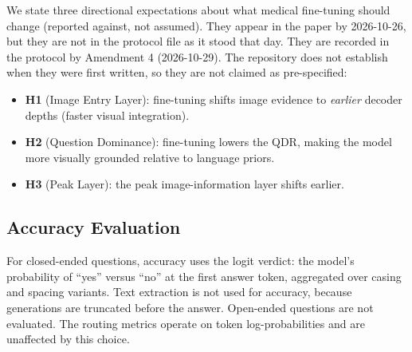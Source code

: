 We state three directional expectations about what medical fine-tuning should change
(reported against, not assumed). They appear in the paper by
2026-10-26, but they are not in the protocol file as it stood that day. They are recorded in
the protocol by Amendment 4 (2026-10-29). The repository does not establish when they were
first written, so they are not claimed as pre-specified:
\begin{itemize}
  \item \textbf{H1} (Image Entry Layer): fine-tuning shifts image evidence to
        \emph{earlier} decoder depths (faster visual integration).
  \item \textbf{H2} (Question Dominance): fine-tuning lowers the QDR, making the
        model more visually grounded relative to language priors.
  \item \textbf{H3} (Peak Layer): the peak image-information layer shifts earlier.
\end{itemize}

\subsection{Accuracy Evaluation}

For closed-ended questions, accuracy uses the logit verdict: the model's probability of
``yes'' versus ``no'' at the first answer token, aggregated over casing and spacing
variants. Text extraction is not used for accuracy, because generations are truncated
before the answer. Open-ended questions are not evaluated. The routing metrics operate on
token log-probabilities and are unaffected by this choice.
